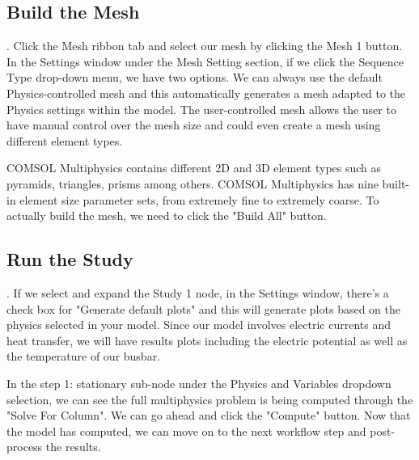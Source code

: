 \subsection{Build the Mesh}.
Click the Mesh ribbon tab and select our mesh by clicking the Mesh 1 button. In the Settings window under the Mesh Setting section, if we click the Sequence Type drop-down menu, we have two options. We can always use the default Physics-controlled mesh and this automatically generates a mesh adapted to the Physics settings within the model. The user-controlled mesh allows the user to have manual control over the mesh size and could even create a mesh using different element types.

COMSOL Multiphysics contains different 2D and 3D element types such as pyramids, triangles, prisms among others. COMSOL Multiphysics has nine built-in element size parameter sets, from extremely fine to extremely coarse. To actually build the mesh, we need to click the "Build All" button.


\subsection{Run the Study}.
If we select and expand the Study 1 node, in the Settings window, there's a check box for "Generate default plots" and this will generate plots based on the physics selected in your model. Since our model involves electric currents and heat transfer, we will have results plots including the electric potential as well as the temperature of our busbar.


In the step 1: stationary sub-node under the Physics and Variables dropdown selection, we can see the full multiphysics problem is being computed through the "Solve For Column". We can go ahead and click the "Compute" button. Now that the model has computed, we can move on to the next workflow step and post-process the results.


